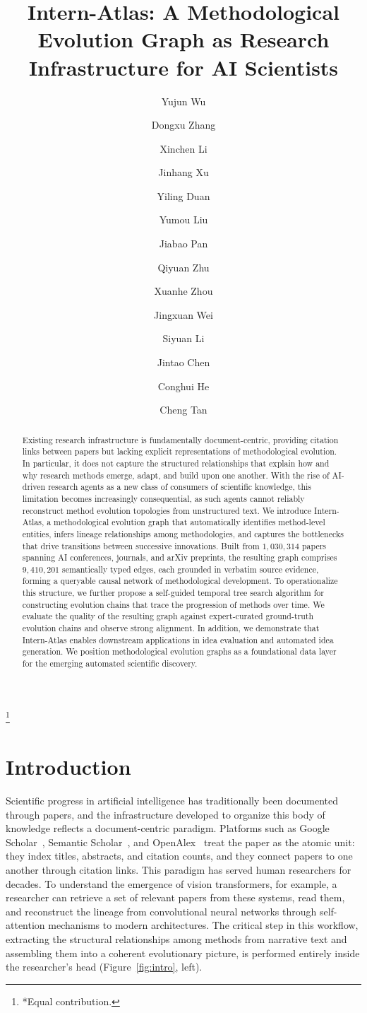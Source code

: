 \documentclass{llmxive}
\title{Intern-Atlas: A Methodological Evolution Graph as Research Infrastructure for AI Scientists}
\author{Yujun Wu \and Dongxu Zhang \and Xinchen Li \and Jinhang Xu \and Yiling Duan \and Yumou Liu \and Jiabao Pan \and Qiyuan Zhu \and Xuanhe Zhou \and Jingxuan Wei \and Siyuan Li \and Jintao Chen \and Conghui He \and Cheng Tan}
\providecommand{\blfootnote}[1]{\footnote{#1}}
\begin{document}
\maketitle
\begin{abstract}
Existing research infrastructure is fundamentally document-centric, providing citation links between papers but lacking explicit representations of methodological evolution. In particular, it does not capture the structured relationships that explain how and why research methods emerge, adapt, and build upon one another. With the rise of AI-driven research agents as a new class of consumers of scientific knowledge, this limitation becomes increasingly consequential, as such agents cannot reliably reconstruct method evolution topologies from unstructured text. We introduce Intern-Atlas, a methodological evolution graph that automatically identifies method-level entities, infers lineage relationships among methodologies, and captures the bottlenecks that drive transitions between successive innovations. Built from $1{,}030{,}314$ papers spanning AI conferences, journals, and arXiv preprints, the resulting graph comprises $9{,}410{,}201$ semantically typed edges, each grounded in verbatim source evidence, forming a queryable causal network of methodological development. To operationalize this structure, we further propose a self-guided temporal tree search algorithm for constructing evolution chains that trace the progression of methods over time. We evaluate the quality of the resulting graph against expert-curated ground-truth evolution chains and observe strong alignment. In addition, we demonstrate that Intern-Atlas enables downstream applications in idea evaluation and automated idea generation. We position methodological evolution graphs as a foundational data layer for the emerging automated scientific discovery.
\end{abstract}
\blfootnote{*Equal contribution.}

\section{Introduction}

Scientific progress in artificial intelligence has traditionally been documented through papers, and the infrastructure developed to organize this body of knowledge reflects a document-centric paradigm. Platforms such as Google Scholar~\cite{google_scholar}, Semantic Scholar~\cite{ammar2018construction}, and OpenAlex~\cite{priem2022openalex} treat the paper as the atomic unit: they index titles, abstracts, and citation counts, and they connect papers to one another through citation links. This paradigm has served human researchers for decades. To understand the emergence of vision transformers, for example, a researcher can retrieve a set of relevant papers from these systems, read them, and reconstruct the lineage from convolutional neural networks through self-attention mechanisms to modern architectures. The critical step in this workflow, extracting the structural relationships among methods from narrative text and assembling them into a coherent evolutionary picture, is performed entirely inside the researcher's head (Figure~\ref{fig:intro}, left).
\end{document}
